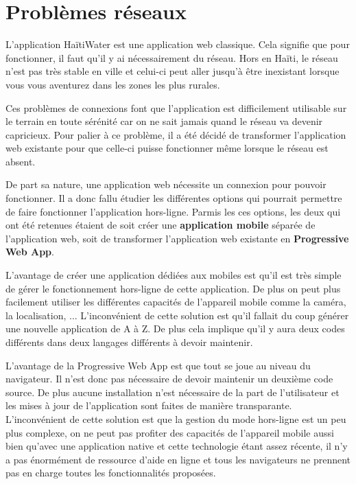 \documentclass{EPL-master-thesis-covers-FR}
\begin{document}
				
				
\newpage
		\section{Problèmes réseaux}
			L'application HaïtiWater est une application web classique. Cela signifie que pour fonctionner, il faut qu'il y ai nécessairement du réseau. Hors en Haïti, le réseau n'est pas très stable en ville et celui-ci peut aller jusqu'à être inexistant lorsque vous vous aventurez dans les zones les plus rurales. 
			
			Ces problèmes de connexions font que l'application est difficilement utilisable sur le terrain en toute sérénité car on ne sait jamais quand le réseau va devenir capricieux. Pour palier à ce problème, il a été décidé de transformer l'application web existante pour que celle-ci puisse fonctionner même lorsque le réseau est absent.
				
			De part sa nature, une application web nécessite un connexion pour pouvoir fonctionner. Il a donc fallu étudier les différentes options qui pourrait permettre de faire fonctionner l'application hors-ligne. Parmis les ces options,  les deux qui ont été retenues étaient de soit créer une \textbf{application mobile} séparée de l'application web, soit de transformer l'application web existante en \textbf{Progressive Web App}. 
				
			L'avantage de créer une application dédiées aux mobiles est qu'il est très simple de gérer le fonctionnement hors-ligne de cette application. De plus on peut plus facilement utiliser les différentes capacités de l'appareil mobile comme la caméra, la localisation, ...
			L'inconvénient de cette solution est qu'il fallait du coup générer une nouvelle application de A à Z. De plus cela implique qu'il y aura deux codes différents dans deux langages différents à devoir maintenir.
				
			L'avantage de la Progressive Web App est que tout se joue au niveau du navigateur. Il n'est donc pas nécessaire de devoir maintenir un deuxième code source. De plus aucune installation n'est nécessaire de la part de l'utilisateur et les mises à jour de l'application sont faites de manière transparante.
			L'inconvénient de cette solution est que la gestion du mode hors-ligne est un peu plus complexe, on ne peut pas profiter des capacités de l'appareil mobile aussi bien qu'avec une application native et cette technologie étant assez récente, il n'y a pas énormément de ressource d'aide en ligne et tous les navigateurs ne prennent pas en charge toutes les fonctionnalités proposées.
				
\end{document}
